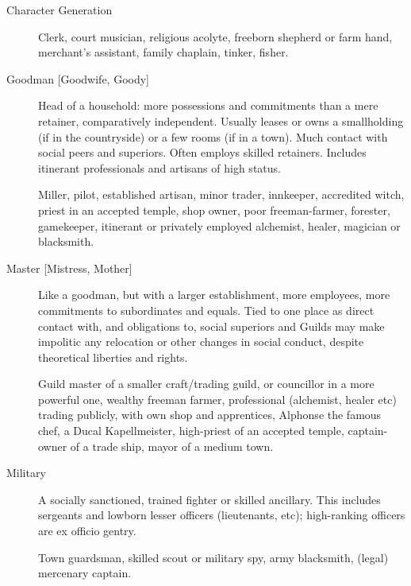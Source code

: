 \begin{Chapter}{Character Generation}
\begin{description}
  \begin{example}
    Clerk, court musician, religious acolyte, freeborn shepherd or
    farm hand, merchant’s assistant, family chaplain, tinker, fisher.
  \end{example}

\item[{Goodman [Goodwife, Goody]}] Head of a household:
  more possessions and commitments than a mere retainer, comparatively
  independent.  Usually leases or owns a smallholding (if in the
  countryside) or a few rooms (if in a town).  Much contact with
  social peers and superiors.  Often employs skilled retainers.
  Includes itinerant professionals and artisans of high status.

    \begin{example} 
      Miller, pilot, established artisan, minor trader, innkeeper,
      accredited witch, priest in an accepted temple, shop owner, poor
      freeman-farmer, forester, gamekeeper, itinerant or privately
      employed alchemist, healer, magician or blacksmith.
    \end{example}
    
\item[{Master [Mistress, Mother]}] Like a goodman, but with
  a larger establishment, more employees, more commitments to
  subordinates and equals.  Tied to one place as direct contact with,
  and obligations to, social superiors and Guilds may make impolitic
  any relocation or other changes in social conduct, despite
  theoretical liberties and rights.

  \begin{example} 
    Guild master of a smaller craft/trading guild, or councillor in a
    more powerful one, wealthy freeman farmer, professional
    (alchemist, healer etc) trading publicly, with own shop and
    apprentices, Alphonse the famous chef, a Ducal Kapellmeister,
    high-priest of an accepted temple, captain-owner of a trade ship,
    mayor of a medium town.
  \end{example}
  
\item[Military] A socially sanctioned, trained fighter or skilled
  ancillary.  This includes sergeants and lowborn lesser officers
  (lieutenants, etc); high-ranking officers are ex officio gentry.
  
  \begin{example} 
    Town guardsman, skilled scout or military spy, army blacksmith,
    (legal) mercenary captain.
  \end{example}


\end{description}
\end{Chapter}

